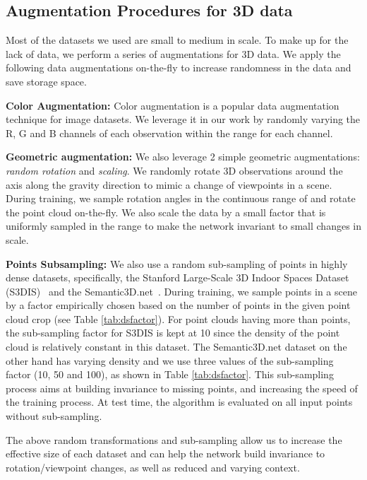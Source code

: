 \documentclass[10pt,twocolumn,letterpaper]{article}
\begin{document}
\subsection{Augmentation Procedures for 3D data}
\label{sec:augmentation}

Most of the datasets we used are small to medium in scale. To make up for the lack of data, we perform a series of augmentations for 3D data. We apply the following data augmentations on-the-fly to increase randomness in the data and save storage space.

\textbf{Color Augmentation:} Color augmentation is a popular data augmentation technique for image datasets. We leverage it in our work by randomly varying the R, G and B channels of each observation within the range  for each channel.

\textbf{Geometric augmentation:} We also leverage 2 simple geometric augmentations: \textit{random rotation} and \textit{scaling}. We randomly rotate 3D observations around the axis along the gravity direction to mimic a change of viewpoints in a scene. During training, we sample rotation angles in the continuous range of  and rotate the point cloud on-the-fly. We also scale the data by a small factor that is uniformly sampled in the range  to make the network invariant to small changes in scale.

\textbf{Points Subsampling:} We also use a random sub-sampling of points in highly dense datasets, specifically, the Stanford Large-Scale 3D Indoor Spaces Dataset (S3DIS)~\cite{Armeni2016} and the Semantic3D.net~\cite{l3d}. During training, we sample points in a scene by a factor empirically chosen based on the number of points in the given point cloud crop (see Table \ref{tab:dsfactor}). For point clouds having more than  points, the sub-sampling factor for S3DIS is kept at 10 since the density of the point cloud is relatively constant in this dataset. The Semantic3D.net dataset on the other hand has varying density and we use three values of the sub-sampling factor (10, 50 and 100), as shown in Table \ref{tab:dsfactor}. This sub-sampling process aims at building invariance to missing points, and increasing the speed of the training process. At test time, the algorithm is evaluated on all input points without sub-sampling.

The above random transformations and sub-sampling allow us to increase the effective size of each dataset and can help the network build invariance to rotation/viewpoint changes, as well as reduced and varying context.
\end{document}
